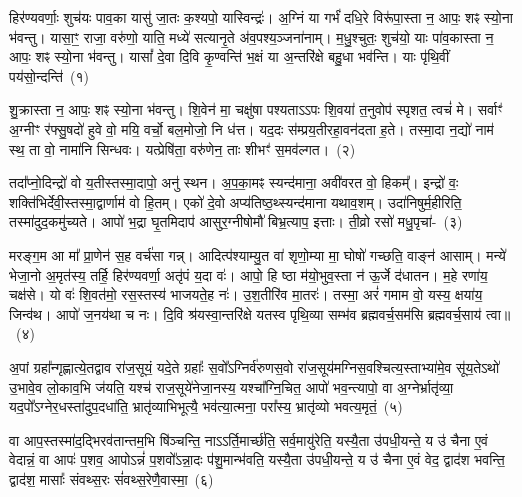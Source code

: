 \setcounter{anuvakam}{0}
हिर॑ण्यवर्णाः॒ शुच॑यः पाव॒का यासु॑ जा॒तः क॒श्यपो॒ यास्विन्द्रः॑। अ॒ग्निं या गर्भं॑ दधि॒रे विरू॑पा॒स्ता न॒ आपः॒ शꣴ स्यो॒ना भ॑वन्तु। यासा॒ꣳ॒ राजा॒ वरु॑णो॒ याति॒ मध्ये॑ सत्यानृ॒ते अ॑व॒पश्य॒ञ्जना॑नाम्। म॒धु॒श्चुतः॒ शुच॑यो॒ याः पा॑व॒कास्ता न॒ आपः॒ शꣴ स्यो॒ना भ॑वन्तु। यासां᳚ दे॒वा दि॒वि कृ॒ण्वन्ति॑ भ॒क्षं या अ॒न्तरि॑क्षे बहु॒धा भव॑न्ति। याः पृ॑थि॒वीं पय॑सो॒न्दन्ति॑~(१)\ip

शु॒क्रास्ता न॒ आपः॒ शꣴ स्यो॒ना भ॑वन्तु। शि॒वेन॑ मा॒ चक्षु॑षा पश्यताऽऽपः शि॒वया॑ त॒नुवोप॑ स्पृशत॒ त्वचं॑ मे। सर्वाꣳ॑ अ॒ग्नीꣳ र॑फ्सु॒षदो॑ हुवे वो॒ मयि॒ वर्चो॒ बल॒मोजो॒ नि ध॑त्त। यद॒दः स॑म्प्रय॒तीरहा॒वन॑दता ह॒ते। तस्मा॒दा न॒द्यो॑ नाम॑ स्थ॒ ता वो॒ नामा॑नि सिन्धवः। यत्प्रेषि॑ता॒ वरु॑णेन॒ ताः शीभꣳ॑ स॒मव॑ल्गत।~(२)\ip

तदा᳚प्नो॒दिन्द्रो॑ वो य॒तीस्तस्मा॒दापो॒ अनु॑ स्थन। अ॒प॒का॒मꣴ स्यन्द॑माना॒ अवी॑वरत वो॒ हिकम्᳚। इन्द्रो॑ वः॒ शक्ति॑भिर्देवी॒स्तस्मा॒द्वार्णाम॑ वो हि॒तम्। एको॑ दे॒वो अप्य॑तिष्ठ॒थ्स्यन्द॑माना यथाव॒शम्। उदा॑निषुर्म॒हीरिति॒ तस्मा॑दुद॒कमु॑च्यते। आपो॑ भ॒द्रा घृ॒तमिदाप॑ आसुर॒ग्नी\-षोमौ॑ बिभ्र॒त्याप॒ इत्ताः। ती॒व्रो रसो॑ मधु॒पृचा॑-~(३)\ip

मरङ्ग॒म आ मा᳚ प्रा॒णेन॑ स॒ह वर्च॑सा गन्न्। आदित्प॑श्याम्यु॒त वा॑ शृणो॒म्या मा॒ घोषो॑ गच्छति॒ वाङ्न॑ आसाम्। मन्ये॑ भेजा॒नो अ॒मृत॑स्य॒ तर्\mbox{}हि॒ हिर॑ण्यवर्णा॒ अतृ॑पं य॒दा वः॑। आपो॒ हि ष्ठा म॑यो॒भुव॒स्ता न॑ ऊ॒र्जे द॑धातन। म॒हे रणा॑य॒ चक्ष॑से। यो वः॑ शि॒वत॑मो॒ रस॒स्तस्य॑ भाजयते॒ह नः॑। उ॒श॒तीरि॑व मा॒तरः॑। तस्मा॒ अरं॑ गमाम वो॒ यस्य॒ क्षया॑य॒ जिन्व॑थ। आपो॑ ज॒नय॑था च नः। दि॒वि श्र॑यस्वा॒न्तरि॑क्षे यतस्व पृथि॒व्या सम्भ॑व ब्रह्मवर्च॒सम॑सि ब्रह्मवर्च॒साय॑ त्वा॥~(४)\ip

{\anuvakamend[{उ॒न्दन्ति॑ स॒मव॑ल्गत मधु॒पृचां᳚ मा॒तरो॒ द्वाविꣳ॑शतिश्च}]}

अ॒पां ग्रहा᳚न्गृह्णात्ये॒तद्वाव रा॑ज॒सूयं॒ यदे॒ते ग्रहाः᳚ स॒वो᳚\-ऽग्निर्व॑रुणस॒वो रा॑ज॒सूय॑मग्नि\-स॒वश्चित्य॒स्ताभ्या॑\-मे॒व सू॑य॒ते\-ऽथो॑ उ॒भावे॒व लो॒काव॒भि ज॑यति॒ यश्च॑ राज॒सूये॑नेजा॒नस्य॒ यश्चा᳚ग्नि॒चित॒ आपो॑ भव॒न्त्यापो॒ वा अ॒ग्नेर्भ्रातृ॑व्या॒ यद॒पो᳚\-ऽग्नेर॒धस्ता॑दुप॒\-दधा॑ति॒ भ्रातृ॑व्याभिभूत्यै॒ भव॑त्या॒त्मना॒ परा᳚स्य॒ भ्रातृ॑व्यो भवत्य॒मृतं॒~(५)\ip

वा आप॒स्तस्मा॑द॒द्भिरव॑तान्तम॒भि षि॑ञ्चन्ति॒ नाऽऽर्ति॒मार्च्छ॑ति॒ सर्व॒मायु॑रेति॒ यस्यै॒ता उ॑पधी॒यन्ते॒ य उ॑ चैना ए॒वं वेदान्नं॒ वा आपः॑ प॒शव॒ आपो\-ऽन्नं॑ प॒शवो᳚\-ऽन्ना॒दः प॑शु॒मान्भ॑वति॒ यस्यै॒ता उ॑पधी॒यन्ते॒ य उ॑ चैना ए॒वं वेद॒ द्वाद॑श भवन्ति॒ द्वाद॑श॒ मासाः᳚ संवथ्स॒रः सं॑वथ्स॒रेणै॒वास्मा॒~(६)\ip

